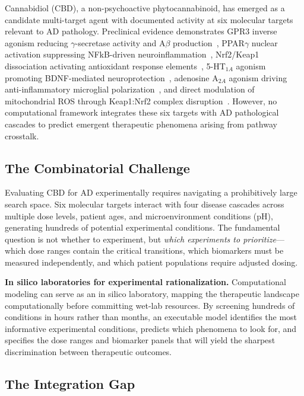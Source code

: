 \documentclass[10pt,letterpaper]{article}
\begin{document}
Cannabidiol (CBD), a non-psychoactive phytocannabinoid, has emerged as a candidate multi-target agent with documented activity at six molecular targets relevant to AD pathology. Preclinical evidence demonstrates GPR3 inverse agonism reducing $\gamma$-secretase activity and A$\beta$ production~\cite{huang2015}, PPAR$\gamma$ nuclear activation suppressing NFkB-driven neuroinflammation~\cite{esposito2011}, Nrf2/Keap1 dissociation activating antioxidant response elements~\cite{casares2020}, 5-HT$_{1A}$ agonism promoting BDNF-mediated neuroprotection~\cite{russo2005}, adenosine A$_{2A}$ agonism driving anti-inflammatory microglial polarization~\cite{mecha2013}, and direct modulation of mitochondrial ROS through Keap1:Nrf2 complex disruption~\cite{booz2011}. However, no computational framework integrates these six targets with AD pathological cascades to predict emergent therapeutic phenomena arising from pathway crosstalk.

\subsection{The Combinatorial Challenge}

Evaluating CBD for AD experimentally requires navigating a prohibitively large search space. Six molecular targets interact with four disease cascades across multiple dose levels, patient ages, and microenvironment conditions (pH), generating hundreds of potential experimental conditions. The fundamental question is not whether to experiment, but \textit{which experiments to prioritize}---which dose ranges contain the critical transitions, which biomarkers must be measured independently, and which patient populations require adjusted dosing.

\vspace{3pt}
\noindent\textbf{In silico laboratories for experimental rationalization.} Computational modeling can serve as an in silico laboratory, mapping the therapeutic landscape computationally before committing wet-lab resources. By screening hundreds of conditions in hours rather than months, an executable model identifies the most informative experimental conditions, predicts which phenomena to look for, and specifies the dose ranges and biomarker panels that will yield the sharpest discrimination between therapeutic outcomes.

\subsection{The Integration Gap}
\end{document}
